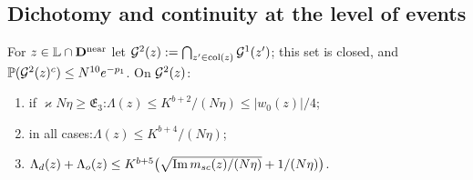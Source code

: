 \subsection{Dichotomy and continuity at the level of events}
\begin{proposition}\label{prop:S2}
For $z\in\mathbb L\cap\mathbf{D}^{\rm near}$ let $\mathcal{G}^2(z):=\bigcap_{z'\in{\rm col}(z)}\mathcal{G}^1(z')$; this set is closed, and $\mathbb{P}(\mathcal{G}^2(z)^c)\le N^{10}e^{-p_1}$. On $\mathcal{G}^2(z)$:
\begin{enumerate}[label=\textup{(\alph*)},leftmargin=2.2em,itemsep=0pt]
\item if $\varkappa N\eta\ge\mathfrak E_3$:\quad $\Lambda(z)\le K^{b+2}/(N\eta)\le|w_0(z)|/4$;
\item in all cases:\quad $\Lambda(z)\le K^{b+4}/(N\eta)$;
\item $\Lambda_d(z)+\Lambda_o(z)\le K^{b+5}\big(\sqrt{\operatorname{Im}m_{sc}(z)/(N\eta)}+1/(N\eta)\big)$.
\end{enumerate}
\end{proposition}

